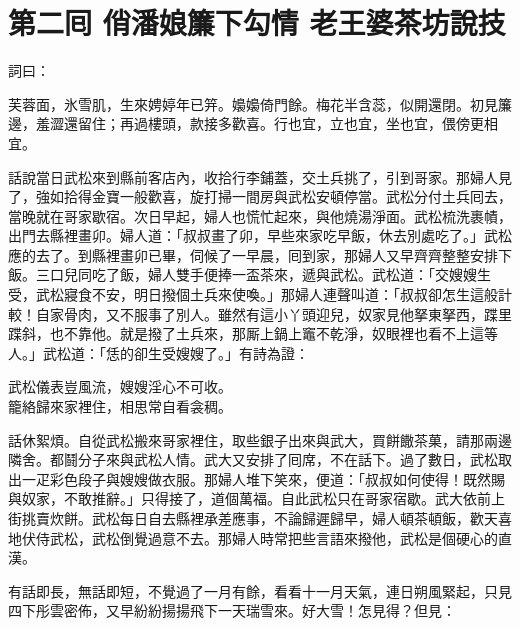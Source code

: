 
\chapter*{第二囘 俏潘娘簾下勾情 老王婆茶坊說技}


詞曰：

\begin{myquote}
芙蓉面，氷雪肌，生來娉婷年已笄。嬝嬝倚門餘。梅花半含蕊，似開還閉。初見簾邊，羞澀還留住；{}再過樓頭，款接多歡喜。行也宜，立也宜，坐也宜，偎傍更相宜。

\end{myquote}

話說當日武松來到縣前客店內，收拾行李鋪蓋，交土兵挑了，引到哥家。那婦人見了，強如拾得金寶一般歡喜，{}旋打掃一間房與武松安頓停當。武松分付土兵囘去，當晚就在哥家歇宿。次日早起，婦人也慌忙起來，與他燒湯淨面。武松梳洗裹幘，出門去縣裡畫卯。婦人道：「叔叔畫了卯，早些來家吃早飯，休去別處吃了。」武松應的去了。到縣裡畫卯已畢，伺候了一早晨，囘到家，那婦人又早齊齊整整安排下飯。三口兒同吃了飯，婦人雙手便捧一盃茶來，遞與武松。武松道：「交嫂嫂生受，武松寢食不安，明日撥個土兵來使喚。」那婦人連聲叫道：「叔叔卻怎生這般計較！自家骨肉，又不服事了別人。{}{}雖然有這小丫頭迎兒，奴家見他拏東拏西，蹀里蹀斜，也不靠他。就是撥了土兵來，那厮上鍋上竈不乾淨，奴眼裡也看不上這等人。」武松道：「恁的卻生受嫂嫂了。」有詩為證：

\begin{myquote}
武松儀表豈風流，嫂嫂淫心不可收。\\
籠絡歸來家裡住，相思常自看衾稠。
\end{myquote}

話休絮煩。自從武松搬來哥家裡住，取些銀子出來與武大，買餅饊茶菓，請那兩邊隣舍。都鬪分子來與武松人情。武大又安排了囘席，不在話下。過了數日，武松取出一疋彩色段子與嫂嫂做衣服。那婦人堆下笑來，便道：「叔叔如何使得！既然賜與奴家，不敢推辭。」只得接了，道個萬福。自此武松只在哥家宿歇。武大依前上街挑賣炊餅。武松每日自去縣裡承差應事，不論歸遲歸早，婦人頓茶頓飯，歡天喜地伏侍武松，武松倒覺過意不去。那婦人時常把些言語來撥他，武松是個硬心的直漢。

有話即長，無話即短，不覺過了一月有餘，看看十一月天氣，連日朔風緊起，只見四下彤雲密佈，又早紛紛揚揚飛下一天瑞雪來。好大雪！怎見得？但見：

